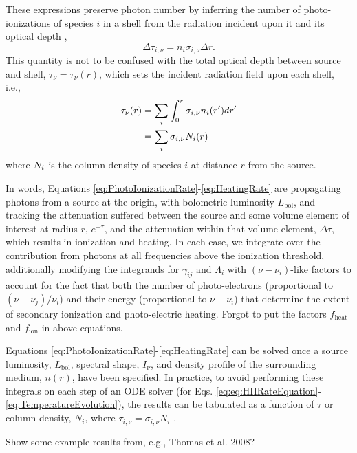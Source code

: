 These expressions preserve photon number by inferring the number of photo-ionizations of species $i$ in a shell from the radiation incident upon it and its optical depth \cite[e.g.,][]{Abel1999},
\begin{equation}
    \Delta \tau_{i,\nu} = n_i \sigma_{i,\nu} \Delta r .
\end{equation}    
This quantity is not to be confused with the total optical depth between source and shell, $\tau_{\nu} = \tau_{\nu}(r)$, which sets the incident radiation field upon each shell, i.e.,
\begin{align}
    \tau_{\nu}(r) & = \sum_i \int_0^r \sigma_{i,\nu} n_i(r^{\prime}) dr^{\prime} \nonumber \\
                  & = \sum_i \sigma_{i,\nu} N_i(r) \label{eq:OpticalDepth}
\end{align}
where $N_i$ is the column density of species $i$ at distance $r$ from the
source. 

In words, Equations \ref{eq:PhotoIonizationRate}-\ref{eq:HeatingRate} are propagating photons from a source at the origin, with bolometric luminosity $L_{\mathrm{bol}}$, and tracking the attenuation suffered between the source and some volume element of interest at radius $r$, $e^{-\tau}$, and the attenuation within that volume element, $\Delta \tau$, which results in ionization and heating. In each case, we integrate over the contribution from photons at all frequencies above the ionization threshold, additionally modifying the integrands for $\gamma_{ij}$ and $\Lambda_i$ with $(\nu - \nu_i)$-like factors to account for the fact that both the number of photo-electrons (proportional to $(\nu - \nu_j) / \nu_i$) and their energy (proportional to $\nu - \nu_i$) that determine the extent of secondary ionization and photo-electric heating. {\color{red} Forgot to put the factors $f_{\mathrm{heat}}$ and $f_{\mathrm{ion}}$ in above equations.}

Equations \ref{eq:PhotoIonizationRate}-\ref{eq:HeatingRate} can be solved once a source luminosity, $L_{\mathrm{bol}}$, spectral shape, $I_{\nu}$, and density profile of the surrounding medium, $n(r)$, have been specified. In practice, to avoid performing these integrals on each step of an ODE solver (for Eqs. \ref{eq:eq:HIIRateEquation}-\ref{eq:TemperatureEvolution}), the results can be tabulated as a function of $\tau$ or column density, $N_i$, where $\tau_{i,\nu}=\sigma_{i,\nu} N_i$ \cite{Thomas2008,Mirocha2012}. 

{\color{red} Show some example results from, e.g., Thomas et al. 2008?}


